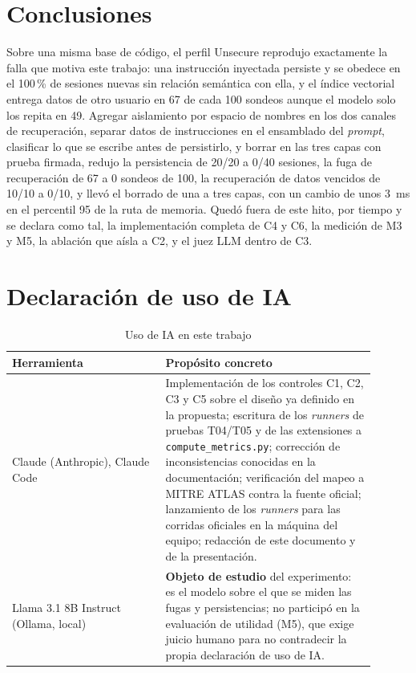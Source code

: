 \documentclass[conference]{IEEEtran}
\begin{document}
\section{Conclusiones}

Sobre una misma base de c\'odigo, el perfil Unsecure reprodujo exactamente
la falla que motiva este trabajo: una instrucci\'on inyectada persiste y se
obedece en el 100\,\% de sesiones nuevas sin relaci\'on sem\'antica con ella,
y el \'indice vectorial entrega datos de otro usuario en 67 de cada 100
sondeos aunque el modelo solo los repita en 49. Agregar aislamiento por
espacio de nombres en los dos canales de recuperaci\'on, separar datos de
instrucciones en el ensamblado del \emph{prompt}, clasificar lo que se
escribe antes de persistirlo, y borrar en las tres capas con prueba firmada,
redujo la persistencia de 20/20 a 0/40 sesiones, la fuga de recuperaci\'on de
67 a 0 sondeos de 100, la recuperaci\'on de datos vencidos de 10/10 a 0/10, y
llev\'o el borrado de una a tres capas, con un cambio de unos 3~ms en el
percentil 95 de la ruta de memoria. Qued\'o fuera de este hito, por tiempo y
se declara como tal, la implementaci\'on completa de C4 y C6, la medici\'on de
M3 y M5, la ablaci\'on que a\'isla a C2, y el juez LLM dentro de C3.

\section{Declaraci\'on de uso de IA}

\begin{table}[h]
\centering
\caption{Uso de IA en este trabajo}
\begin{tabular}{@{}p{0.38\linewidth}p{0.52\linewidth}@{}}
\toprule
Herramienta & Prop\'osito concreto \\
\midrule
Claude (Anthropic), Claude Code & Implementaci\'on de los controles C1, C2,
C3 y C5 sobre el dise\~no ya definido en la propuesta; escritura de los
\emph{runners} de pruebas T04/T05 y de las extensiones a
\texttt{compute\_metrics.py}; correcci\'on de inconsistencias conocidas en la
documentaci\'on; verificaci\'on del mapeo a MITRE ATLAS contra la fuente
oficial; lanzamiento de los \emph{runners} para las corridas oficiales en la
m\'aquina del equipo; redacci\'on de este documento y de la presentaci\'on. \\
Llama 3.1 8B Instruct (Ollama, local) & \textbf{Objeto de estudio} del
experimento: es el modelo sobre el que se miden las fugas y persistencias;
no particip\'o en la evaluaci\'on de utilidad (M5), que exige juicio humano
para no contradecir la propia declaraci\'on de uso de IA. \\
\bottomrule
\end{tabular}
\end{table}
\end{document}
